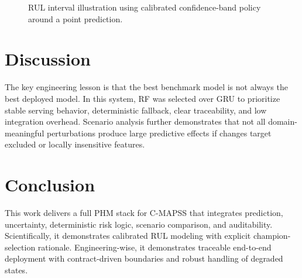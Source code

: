 \documentclass[11pt]{article}
\begin{document}
\begin{figure}[H]
\centering
{}
\caption{RUL interval illustration using calibrated confidence-band policy around a point prediction.}
\label{fig:interval_plot}
\end{figure}

\section{Discussion}
The key engineering lesson is that the best benchmark model is not always the best deployed model. In this system, RF was selected over GRU to prioritize stable serving behavior, deterministic fallback, clear traceability, and low integration overhead. Scenario analysis further demonstrates that not all domain-meaningful perturbations produce large predictive effects if changes target excluded or locally insensitive features.

\section{Conclusion}
This work delivers a full PHM stack for C-MAPSS that integrates prediction, uncertainty, deterministic risk logic, scenario comparison, and auditability. Scientifically, it demonstrates calibrated RUL modeling with explicit champion-selection rationale. Engineering-wise, it demonstrates traceable end-to-end deployment with contract-driven boundaries and robust handling of degraded states.



\end{document}
